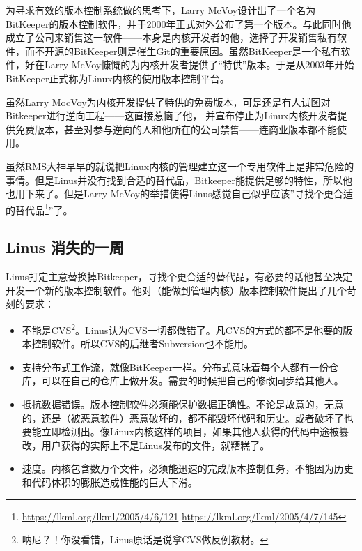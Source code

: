为寻求有效的版本控制系统做的思考下，Larry McVoy设计出了一个名为BitKeeper的版本控制软件，并于2000年正式对外公布了第一个版本。与此同时他成立了公司来销售这一软件——本身是内核开发者的他，选择了开发销售私有软件，而不开源的BitKeeper则是催生Git的重要原因。虽然BitKeeper是一个私有软件，好在Larry McVoy慷慨的为内核开发者提供了“特供”版本。于是从2003年开始BitKeeper正式称为Linux内核的使用版本控制平台。

虽然Larry MocVoy为内核开发提供了特供的免费版本，可是还是有人试图对Bitkeeper进行逆向工程——这直接惹恼了他，
并宣布停止为Linux内核开发者提供免费版本，甚至对参与逆向的人和他所在的公司禁售——连商业版本都不能使用。

虽然RMS大神早早的就说把Linux内核的管理建立这一个专用软件上是非常危险的事情。但是Linus并没有找到合适的替代品，Bitkeeper能提供足够的特性，所以他也用下来了。但是Larry McVoy的举措使得Linus感觉自己似乎应该”寻找个更合适的替代品\footnote{\url{https://lkml.org/lkml/2005/4/6/121} \url{https://lkml.org/lkml/2005/4/7/145}}”了。

\subsection{Linus 消失的一周}

Linus打定主意替换掉Bitkeeper，寻找个更合适的替代品，有必要的话他甚至决定开发一个新的版本控制软件。他对（能做到管理内核）版本控制软件提出了几个苛刻的要求：

\begin{itemize}
\item 不能是CVS\footnote{呐尼？！你没看错，Linus原话是说拿CVS做反例教材。}。Linus认为CVS一切都做错了。凡CVS的方式的都不是他要的版本控制软件。所以CVS的后继者Subversion也不能用。
\item 支持分布式工作流，就像BitKeeper一样。分布式意味着每个人都有一份仓库，可以在自己的仓库上做开发。需要的时候把自己的修改同步给其他人。

\item 抵抗数据错误。版本控制软件必须能保护数据正确性。不论是故意的，无意的，还是（被恶意软件）恶意破坏的，都不能毁坏代码和历史。或者破坏了也要能立即检测出。像Linux内核这样的项目，如果其他人获得的代码中途被篡改，用户获得的实际上不是Linus发布的文件，就糟糕了。

\item 速度。内核包含数万个文件，必须能迅速的完成版本控制任务，不能因为历史和代码体积的膨胀造成性能的巨大下滑。

\end{itemize}

